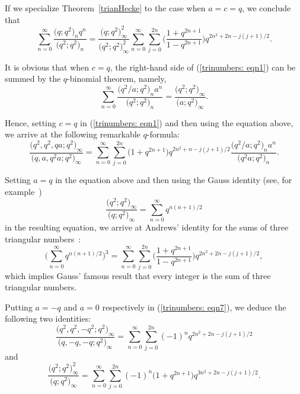 \documentclass[pdftex]{sigma}
\numberwithin{equation}{section}
\begin{document}
If we specialize Theorem~\ref{trianHecke} to the case when $a=c=q$, we conclude that
\begin{equation*}%
\sum_{n=0}^\infty \frac{\bigl(q; q^2\bigr)_n q^n}{\bigl(q^2; q^2\bigr)_n}
=\frac{\bigl(q; q^2\bigr)^2_\infty}{\bigl(q^2; q^2\bigr)^2_\infty}
\sum_{n=0}^\infty \sum_{j=0}^{2n} \biggl(\frac{1+q^{2n+1}}{1-q^{2n+1}}\biggr)
q^{2n^2+2n-j(j+1)/2}.
\end{equation*}

It is obvious that when $c=q$, the right-hand side of (\ref{trinumbers: eqn1}) can be summed by the $q$-binomial theorem, namely,
\begin{equation*}%
	\sum_{n=0}^\infty \frac{\bigl(q^2/a; q^2\bigr)_n a^n}{\bigl(q^2; q^2\bigr)_n}
	=\frac{\bigl(q^2; q^2\bigr)_\infty}{\bigl(a; q^2\bigr)_\infty}.
\end{equation*}

Hence, setting $c=q$ in (\ref{trinumbers: eqn1}) and then using the equation above, we arrive at the following remarkable $q$-formula:
\begin{equation}\label{trinumbers: eqn7}
\frac{\bigl(q^2, q^2, qa; q^2\bigr)_\infty}{\bigl(q, a, q^2a; q^2\bigr)_\infty}
=\sum_{n=0}^\infty \sum_{j=0}^{2n} \bigl(1+q^{2n+1}\bigr) q^{2n^2+n-j(j+1)/2}
\frac{\bigl(q^2/a; q^2\bigr)_n a^n}{\bigl(q^2a; q^2\bigr)_n}.
\end{equation}

Setting $a=q$ in the equation above and then using the Gauss identity
(see, for example~\mbox{\cite[p.~347]{Liu2010pacific})}
\[
\frac{\bigl(q^2; q^2\bigr)_\infty}{\bigl(q; q^2\bigr)_\infty}=\sum_{n=0}^\infty q^{n(n+1)/2}
\]
in the resulting equation, we arrive at Andrews' identity for the sums of three triangular num\-bers~\cite[equation~(1.5)]{Andrews86}:
\begin{equation}\label{trinumbers:eqn8}
\Biggl(\sum_{n=0}^\infty q^{n(n+1)/2}\Biggr)^3
=\sum_{n=0}^\infty \sum_{j=0}^{2n} \biggl(\frac{1+q^{2n+1}}{1-q^{2n+1}}\biggr) q^{2n^2+2n-j(j+1)/2},
\end{equation}
which implies Gauss' famous result that every integer is the sum of three triangular numbers.

Putting $a=-q$ and $a=0$ respectively in (\ref{trinumbers: eqn7}), we deduce the following two identities:
\begin{equation*}%
\frac{\bigl(q^2, q^2, -q^2; q^2\bigr)_\infty}{\bigl(q, -q, -q; q^2\bigr)_\infty}
=\sum_{n=0}^\infty \sum_{j=0}^{2n} (-1)^n q^{2n^2+2n-j(j+1)/2}
\end{equation*}
and
\begin{equation*}%
\frac{\bigl(q^2; q^2\bigr)^2_\infty}{\bigl(q; q^2\bigr)_\infty}
=\sum_{n=0}^\infty \sum_{j=0}^{2n} (-1)^n \bigl(1+q^{2n+1}\bigr) q^{3n^2+2n-j(j+1)/2}.
\end{equation*}
\end{document}
